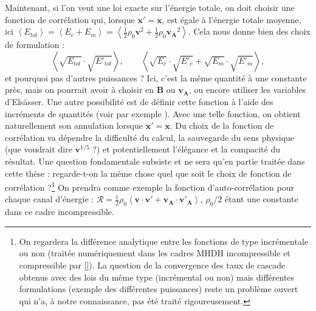 Maintenant, si l'on veut une loi exacte sur l'énergie totale, on doit choisir une fonction de corrélation qui, lorsque $\boldsymbol{x'}= \boldsymbol{x}$, est égale à l'énergie totale moyenne, ici $\left<E_{tot}\right> = \left<E_c + E_m\right> = \left<\frac{1}{2} \rho_0 \boldsymbol{v}^2 + \frac{1}{2} \rho_0 \boldsymbol{v_A}^2\right>$. Cela nous donne bien des choix de formulation : 
\[\left<\sqrt{E_{tot}} \cdot \sqrt{E'_{tot}}\right>, \qquad \left<\sqrt{E_c} \cdot \sqrt{E'_c} + \sqrt{E_m} \cdot \sqrt{E'_m} \right>,\] et pourquoi pas d'autres puissances ? Ici, c'est la même quantité à une constante près, mais on pourrait avoir à choisir en $\boldsymbol{B}$ ou $\boldsymbol{v_A}$, ou encore utiliser les variables d'Elsässer. Une autre possibilité est de définir cette fonction à l'aide des incréments de quantités (voir par exemple \cite{antonia_analogy_1997}). Avec une telle fonction, on obtient naturellement son annulation lorsque $\boldsymbol{x'}= \boldsymbol{x}$. Du choix de la fonction de corrélation va dépendre la difficulté du calcul, la sauvegarde du sens physique (que voudrait dire $\boldsymbol{v}^{1/5}$ ?) et potentiellement l'élégance et la compacité du résultat. Une question fondamentale subsiste et ne sera qu'en partie traitée dans cette thèse : regarde-t-on la même chose quel que soit le choix de fonction de corrélation ?\footnote{On regardera la différence analytique entre les fonctions de type incrémentale ou non (traitée numériquement dans les cadres \ac{MHDH} incompressible et compressible par [\cite{ferrand_exact_2019,ferrand_-depth_2022}]). La question de la convergence des taux de cascade obtenus avec des lois du même type (incrémental ou non) mais différentes formulations (exemple des différentes puissances) reste un problème ouvert qui n'a, à notre connaissance, pas été traité rigoureusement.} On prendra comme exemple la fonction d'auto-corrélation pour chaque canal d'énergie : $\mathcal{R} = \frac{1}{2} \rho_0\left< \boldsymbol{v} \cdot \boldsymbol{v'} + \boldsymbol{v_A} \cdot \boldsymbol{v'_A}\right>$, $\rho_0/2$ étant une constante dans ce cadre incompressible. 

